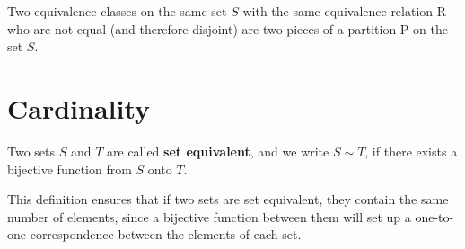 \begin{eg}
	Two equivalence classes on the same set $S$ with the same equivalence relation R who are not equal (and therefore disjoint) are two pieces of a partition P on the set $S$.
\end{eg}

\newpage
\section{Cardinality}

\begin{definition}
	Two sets $S$ and $T$ are called \textbf{set equivalent}, and we write $S\sim T$, if there exists a bijective function from $S$ onto $T$.
\end{definition}

This definition ensures that if two sets are set equivalent, they contain the same number of elements, since a bijective function between them will set up a one-to-one correspondence between the elements of each set.







































